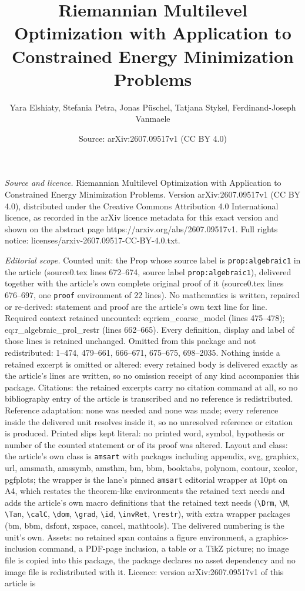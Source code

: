 \documentclass[10pt,a4paper]{amsart}
\title[Riemannian Multilevel Optimization with Application to Const]{Riemannian Multilevel Optimization with Application to Constrained Energy Minimization Problems}
\author{Yara Elshiaty, Stefania Petra, Jonas P\"uschel, Tatjana Stykel, Ferdinand-Joseph Vanmaele}
\date{Source: arXiv:2607.09517v1 (CC BY 4.0)}
\begin{document}
\maketitle

\noindent\emph{Source and licence.} Riemannian Multilevel Optimization with Application to Constrained Energy Minimization Problems. Version arXiv:2607.09517v1 (CC BY 4.0), distributed under the Creative Commons Attribution 4.0 International licence, as recorded in the arXiv licence metadata for this exact version and shown on the abstract page https://arxiv.org/abs/2607.09517v1. Full rights notice: licenses/arxiv-2607.09517-CC-BY-4.0.txt.\par\smallskip

\noindent\textit{Editorial scope.} Counted unit: the Prop whose source label is \texttt{prop:algebraic1} in the article (source0.tex lines 672--674, source label \texttt{prop:algebraic1}), delivered together with the article's own complete original proof of it (source0.tex lines 676--697, one \texttt{proof} environment of 22 lines). No mathematics is written, repaired or re-derived: statement and proof are the article's own text line for line. Required context retained uncounted: eq:riem\_coarse\_model (lines 475--478); eq:r\_algebraic\_prol\_restr (lines 662--665). Every definition, display and label of those lines is retained unchanged. Omitted from this package and not redistributed: 1--474, 479--661, 666--671, 675--675, 698--2035. Nothing inside a retained excerpt is omitted or altered: every retained body is delivered exactly as the article's lines are written, so no omission receipt of any kind accompanies this package. Citations: the retained excerpts carry no citation command at all, so no bibliography entry of the article is transcribed and no reference is redistributed. Reference adaptation: none was needed and none was made; every reference inside the delivered unit resolves inside it, so no unresolved reference or citation is produced. Printed slips kept literal: no printed word, symbol, hypothesis or number of the counted statement or of its proof was altered. Layout and class: the article's own class is \texttt{amsart} with packages including appendix, svg, graphicx, url, amsmath, amssymb, amsthm, bm, bbm, booktabs, polynom, contour, xcolor, pgfplots; the wrapper is the lane's pinned \texttt{amsart} editorial wrapper at 10pt on A4, which restates the theorem-like environments the retained text needs and adds the article's own macro definitions that the retained text needs (\texttt{\textbackslash Drm}, \texttt{\textbackslash M}, \texttt{\textbackslash Tan}, \texttt{\textbackslash calC}, \texttt{\textbackslash dom}, \texttt{\textbackslash grad}, \texttt{\textbackslash id}, \texttt{\textbackslash invRet}, \texttt{\textbackslash restr}), with extra wrapper packages (bm, bbm, dsfont, xspace, cancel, mathtools). The delivered numbering is the unit's own. Assets: no retained span contains a figure environment, a graphics-inclusion command, a PDF-page inclusion, a table or a TikZ picture; no image file is copied into this package, the package declares no asset dependency and no image file is redistributed with it. Licence: version arXiv:2607.09517v1 of this article is 
\end{document}
